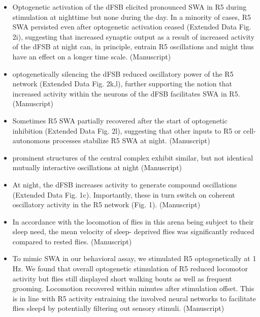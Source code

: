\documentclass[11pt]{article}
\begin{document}
\begin{itemize}
    \item Optogenetic activation of the dFSB elicited pronounced SWA in
    R5 during stimulation at nighttime but none during the day.
    In a
    minority of cases, R5 SWA persisted even after optogenetic activation ceased (Extended Data
    Fig. 2i), suggesting that increased synaptic output as a result of increased activity of the dFSB
    at night can, in principle, entrain R5 oscillations and might thus have an effect on a longer time
    scale. 
    \cite{raccugliaCoherentMultilevelNetwork2022} (Manuscript)

    \item optogenetically silencing the dFSB reduced oscillatory
    power of the R5 network (Extended Data Fig. 2k,l), further supporting the notion that
    increased activity within the neurons of the dFSB facilitates SWA in R5. 
    \cite{raccugliaCoherentMultilevelNetwork2022} (Manuscript)

    \item Sometimes R5 SWA
    partially recovered after the start of optogenetic inhibition (Extended Data Fig. 2l), suggesting
    that other inputs to R5 or cell-autonomous processes stabilize R5 SWA at night.
    \cite{raccugliaCoherentMultilevelNetwork2022} (Manuscript)

    \item prominent structures of the
    central complex exhibit similar, but not identical mutually interactive oscillations at night
    \cite{raccugliaCoherentMultilevelNetwork2022} (Manuscript)

    \item At night, the dFSB increases activity to generate compound
    oscillations (Extended Data Fig. 1c). Importantly, these in turn switch on coherent oscillatory
    activity in the R5 network (Fig. 1).
    \cite{raccugliaCoherentMultilevelNetwork2022} (Manuscript)

    \item In accordance with the
    locomotion of flies in this arena being subject to their sleep need, the mean velocity of sleep-
    deprived flies was significantly reduced compared to rested flies.
    \cite{raccugliaCoherentMultilevelNetwork2022} (Manuscript)

    \item To mimic SWA in our behavioral assay, we stimulated R5 optogenetically at 1 Hz.
    We found that overall optogenetic stimulation of R5 reduced locomotor activity
    but flies still displayed short walking bouts as well as frequent
    grooming. Locomotion recovered within minutes after stimulation offset.
    This is in line with R5 activity entraining the involved neural networks to facilitate flies sleep4
    by potentially filtering out sensory stimuli.
    \cite{raccugliaCoherentMultilevelNetwork2022} (Manuscript)


\end{itemize}
\end{document}
